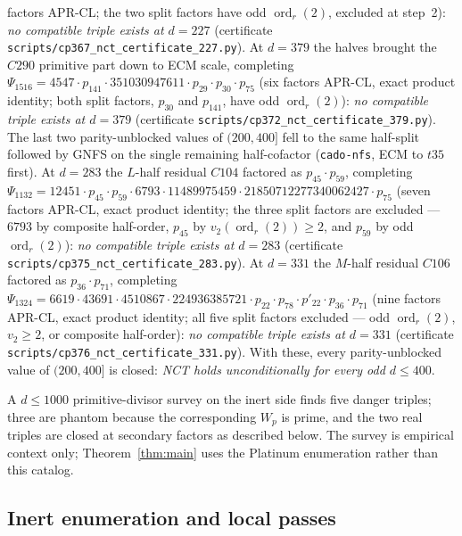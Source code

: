 \documentclass[11pt]{amsart}
\theoremstyle{plain}
\theoremstyle{definition}
\theoremstyle{remark}
\numberwithin{equation}{section}
\newcommand{\ord}{\operatorname{ord}}
\begin{document}
factors APR-CL; the two split factors have odd $\ord_r(2)$, excluded at step~2): \emph{no compatible triple exists at $d = 227$} (certificate \texttt{scripts/}\allowbreak\texttt{cp367\_nct\_certificate\_227.py}). At $d = 379$ the halves brought the $C290$ primitive part down to ECM scale, completing $\Psi_{1516} = 4547 \cdot p_{141} \cdot 351030947611 \cdot p_{29} \cdot p_{30} \cdot p_{75}$ (six factors APR-CL, exact product identity; both split factors, $p_{30}$ and $p_{141}$, have odd $\ord_r(2)$): \emph{no compatible triple exists at $d = 379$} (certificate \texttt{scripts/}\allowbreak\texttt{cp372\_nct\_certificate\_379.py}). The last two parity-unblocked values of $(200, 400]$ fell to the same half-split followed by GNFS on the single remaining half-cofactor (\texttt{cado-nfs}, ECM to $t35$ first). At $d = 283$ the $L$-half residual $C104$ factored as $p_{45} \cdot p_{59}$, completing $\Psi_{1132} = 12451 \cdot p_{45} \cdot p_{59} \cdot 6793 \cdot 11489975459 \cdot 21850712277340062427 \cdot p_{75}$ (seven factors APR-CL, exact product identity; the three split factors are excluded --- $6793$ by composite half-order, $p_{45}$ by $v_2(\ord_r(2)) \geq 2$, and $p_{59}$ by odd $\ord_r(2)$): \emph{no compatible triple exists at $d = 283$} (certificate \texttt{scripts/}\allowbreak\texttt{cp375\_nct\_certificate\_283.py}). At $d = 331$ the $M$-half residual $C106$ factored as $p_{36} \cdot p_{71}$, completing $\Psi_{1324} = 6619 \cdot 43691 \cdot 4510867 \cdot 224936385721 \cdot p_{22} \cdot p_{78} \cdot p'_{22} \cdot p_{36} \cdot p_{71}$ (nine factors APR-CL, exact product identity; all five split factors excluded --- odd $\ord_r(2)$, $v_2 \geq 2$, or composite half-order): \emph{no compatible triple exists at $d = 331$} (certificate \texttt{scripts/}\allowbreak\texttt{cp376\_nct\_certificate\_331.py}). With these, every parity-unblocked value of $(200, 400]$ is closed: \emph{NCT holds unconditionally for every odd $d \leq 400$}.

A $d\leq1000$ primitive-divisor survey on the inert side finds five danger triples; three are phantom because the corresponding $W_p$ is prime, and the two real triples are closed at secondary factors as described below. The survey is empirical context only; Theorem~\ref{thm:main} uses the Platinum enumeration rather than this catalog.

\subsection{Inert enumeration and local passes}\label{sec:inert-survey}\label{sec:secondary}
\end{document}

